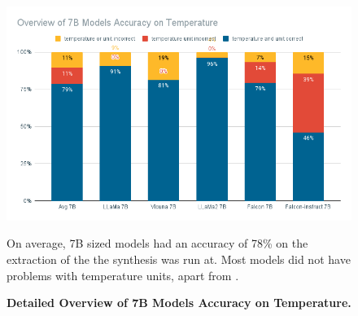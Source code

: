 \begin{figure}[!htb]
    \begin{centering}
        \includegraphics[width=\textwidth]{img/overview_7b_temp}
        \caption[7B Models Detailed Temperature Accuracy]{\textbf{Detailed Overview of 7B Models Accuracy on Temperature.}}
        On average, 7B sized models had an accuracy of 78\% on the extraction of the \ttemp the synthesis was run at.
        Most models did not have problems with temperature units, apart from .
        \label{fig:7b_temp}
    \end{centering}
\end{figure}

